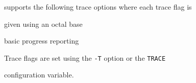 









 supports the following trace options where each trace flag is 


given using an octal base


\begin{optlist}


    basic progress reporting


\end{optlist}


Trace flags are set using the \texttt{-T} option or the \texttt{TRACE}


configuration variable.




